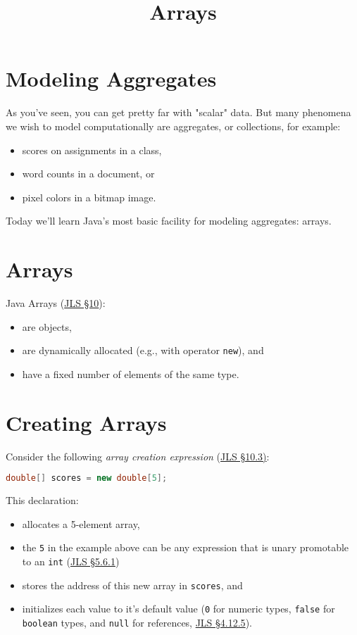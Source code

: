 \documentclass{article}
\title{Arrays}
\date{}
\begin{document}
\maketitle

\section{Modeling Aggregates}


As you've seen, you can get pretty far with "scalar" data.  But many phenomena we wish to model computationally are aggregates, or collections, for example:
\begin{itemize}
\item scores on assignments in a class,
\item word counts in a document, or
\item pixel colors in a bitmap image.
\end{itemize}

Today we'll learn Java's most basic facility for modeling aggregates: arrays.

\section{Arrays}


Java Arrays (\href{http://docs.oracle.com/javase/specs/jls/se8/html/jls-10.html}{JLS \S 10}):
\begin{itemize}
\item are objects,
\item are dynamically allocated (e.g., with operator {\tt new}), and
\item have a fixed number of elements of the same type.
\end{itemize}


\section{Creating Arrays}


Consider the following {\it array creation expression} (\href{http://docs.oracle.com/javase/specs/jls/se8/html/jls-10.html#jls-10.3}{JLS \S 10.3)}:
\begin{lstlisting}[language=Java]
double[] scores = new double[5];
\end{lstlisting}
This declaration:
\begin{itemize}
\item allocates a 5-element array,
\item the {\tt 5} in the example above can be any expression that is unary promotable to an {\tt int} (\href{http://docs.oracle.com/javase/specs/jls/se8/html/jls-5.html#jls-5.6.1}{JLS \S 5.6.1})
\item stores the address of this new array in {\tt scores}, and
\item initializes each value to it's default value ({\tt 0} for numeric types, {\tt false} for {\tt boolean} types, and {\tt null} for references, \href{http://docs.oracle.com/javase/specs/jls/se8/html/jls-4.html#jls-4.12.5}{JLS \S 4.12.5}).
\end{itemize}
\end{document}
